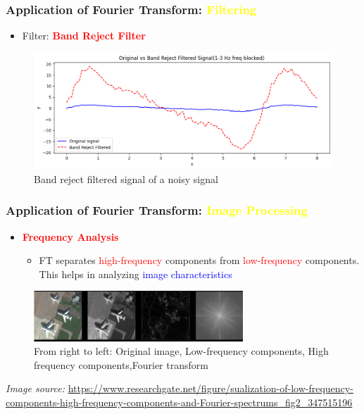 \documentclass[aspectratio=1610]{beamer}
\begin{document}
  \begin{frame}
    \frametitle{Application of Fourier Transform: \textcolor{yellow}{Filtering}}
    \begin{itemize} [label=$\star$, itemsep=4pt, parsep=0pt, topsep=10pt]
        \item<1-> Filter:  \textbf{\textcolor{red}{Band Reject Filter}}
    \end{itemize}
    \vspace{-10pt}
    \begin{figure}
        \centering
        \includegraphics[width=0.8\linewidth,height=0.5\linewidth]{images/bandRejectSignal.png}
        \caption{Band reject filtered signal of a noisy signal}
        \label{fig:enter-label}
    \end{figure}
  \end{frame}
  
  \begin{frame}
    \frametitle{Application of Fourier Transform: \textcolor{yellow}{Image Processing}}
    \begin{itemize}[label=$\star$, itemsep=7pt, parsep=0pt, topsep=10pt]
       \item<1-> \textbf{\textcolor{red}{Frequency Analysis}} 
           \begin{itemize} [label=$\bullet$, itemsep=7pt, parsep=0pt, topsep=10pt]
               \item<2-> FT separates \textcolor{red}{high-frequency} components from \textcolor{red}{low-frequency} components. This helps in analyzing \textcolor{blue}{image characteristics}
           \end{itemize}
    \end{itemize}
    \vspace{10pt}
    \begin{figure}
        \centering
        \includegraphics[width = 0.7\textwidth]{images/lowFreqHighFreq.png}
        \caption{From right to left: Original image, Low-frequency components, High frequency components,Fourier transform}
    \end{figure}
    \vfill 
    \tiny \textit{Image source:} \url{https://www.researchgate.net/figure/sualization-of-low-frequency-components-high-frequency-components-and-Fourier-spectrums_fig2_347515196} 
  \end{frame}
  
\end{document}
